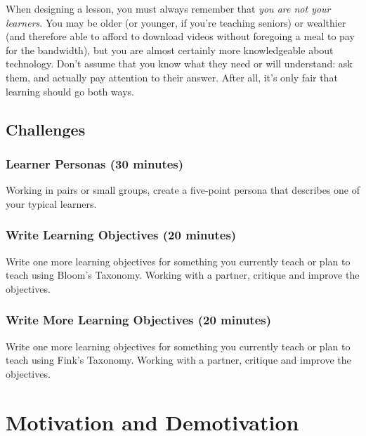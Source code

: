 \documentclass[10pt,statementpaper]{memoir}
\begin{document}
When designing a lesson, you must always remember that \emph{you are not
your learners}. You may be older (or younger, if you're teaching
seniors) or wealthier (and therefore able to afford to download videos
without foregoing a meal to pay for the bandwidth), but you are almost
certainly more knowledgeable about technology. Don't assume that you
know what they need or will understand: ask them, and actually pay
attention to their answer. After all, it's only fair that learning
should go both ways.

\section{Challenges}\label{challenges-5}

\subsection*{Learner Personas (30
minutes)}\label{learner-personas-30-minutes}

Working in pairs or small groups, create a five-point persona that
describes one of your typical learners.

\subsection*{Write Learning Objectives (20
minutes)}\label{write-learning-objectives-20-minutes}

Write one more learning objectives for something you currently teach or
plan to teach using Bloom's Taxonomy. Working with a partner, critique
and improve the objectives.

\subsection*{Write More Learning Objectives (20
minutes)}\label{write-more-learning-objectives-20-minutes}

Write one more learning objectives for something you currently teach or
plan to teach using Fink's Taxonomy. Working with a partner, critique
and improve the objectives.

\chapter{Motivation and Demotivation}\label{motivation-and-demotivation}
\end{document}
